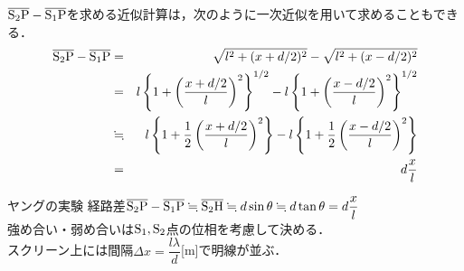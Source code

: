 $ \overline{{\rm S_2P}} -\overline{{\rm S_1P}}$を求める近似計算は，次のように一次近似を用いて求めることもできる．
\begin{eqnarray*}
 \overline{{\rm S_2P}} -\overline{{\rm S_1P}} &=& \sqrt{l^2+(x+d/2)^2}-\sqrt{l^2+(x-d/2)^2}\\
 &=&l\left\{ 1+\left( \dfrac{x+d/2}{l} \right)^2 \right\}^{1/2}-l\left\{ 1+\left( \dfrac{x-d/2}{l} \right)^2 \right\}^{1/2}\\
 &\fallingdotseq& l\left\{ 1+\dfrac{1}{2} \left( \dfrac{x+d/2}{l} \right)^2 \right\}-l\left\{ 1+\dfrac{1}{2} \left( \dfrac{x-d/2}{l} \right)^2 \right\}\\
 &=&d\dfrac{x}{l}
\end{eqnarray*}

\hrulefill


 \begin{matome}{ヤングの実験}
 \hspace{3mm} 経路差$\overline{{\rm S_2P}} -\overline{{\rm S_1P}}\fallingdotseq \overline{{\rm S_2H}} \fallingdotseq d\sin \theta \fallingdotseq d\tan \theta =d\dfrac{x}{l}$\\
 強め合い・弱め合いは${\rm S_1,S_2}$点の位相を考慮して決める．\\
 スクリーン上には間隔$\Delta x=\dfrac{l\lambda}{d}$[m]で明線が並ぶ．
 \end{matome}

